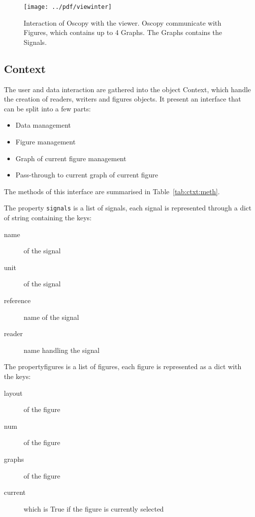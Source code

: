 \documentclass[a4paper,11pt]{article}
\newcommand{\cls}[1]{\textsf{#1}}
\newcommand{\prop}[1]{\texttt{#1}}
\newcommand{\ctx}{\cls{Context}}
\newcommand{\sig}{\cls{Signal}}
\begin{document}
\begin{figure}[htbp]
  \centering
  \texttt{[image: ../pdf/viewinter]}
  \caption{Interaction  of Oscopy with the viewer. Oscopy communicate with Figures, which contains up to 4 Graphs. The Graphs contains the \sig s.}
  \label{fig:viewinter}
\end{figure}

\subsection{Context}
The user and data interaction are gathered into the object \ctx, which handle the creation of readers, writers and figures objects.
It present an interface that can be split into a few parts:
\begin{itemize}
\item Data management
\item Figure management
\item Graph of current figure management
\item Pass-through to current graph of current figure
\end{itemize}
The methods of this interface are summarised in Table~\ref{tab:ctxt:meth}.

The property \prop{signals} is a list of signals, each signal is represented through a dict of string containing the keys:
\begin{description}
\item[name] of the signal
\item[unit] of the signal
\item[reference] name of the signal
\item[reader] name handling the signal
\end{description}
The property{figures} is a list of figures, each figure is represented as a dict with the keys:
\begin{description}
\item[layout] of the figure
\item[num] of the figure
\item[graphs] of the figure
\item[current] which is True if the figure is currently selected
\end{description}
\end{document}

